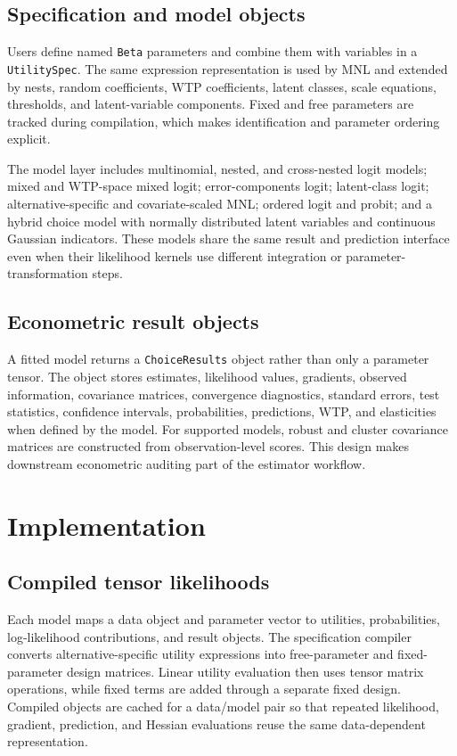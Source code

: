 \documentclass[11pt]{article}
\begin{document}
\subsection{Specification and model objects}

Users define named \texttt{Beta} parameters and combine them with variables in a
\texttt{UtilitySpec}. The same expression representation is used by MNL and
extended by nests, random coefficients, WTP coefficients, latent classes,
scale equations, thresholds, and latent-variable components. Fixed and free
parameters are tracked during compilation, which makes identification and
parameter ordering explicit.

The model layer includes multinomial, nested, and cross-nested logit models;
mixed and WTP-space mixed logit; error-components logit; latent-class logit;
alternative-specific and covariate-scaled MNL; ordered logit and probit; and a
hybrid choice model with normally distributed latent variables and continuous
Gaussian indicators. These models share the same result and prediction
interface even when their likelihood kernels use different integration or
parameter-transformation steps.

\subsection{Econometric result objects}

A fitted model returns a \texttt{ChoiceResults} object rather than only a
parameter tensor. The object stores estimates, likelihood values, gradients,
observed information, covariance matrices, convergence diagnostics, standard
errors, test statistics, confidence intervals, probabilities, predictions, WTP,
and elasticities when defined by the model. For supported models, robust and
cluster covariance matrices are constructed from observation-level scores. This
design makes downstream econometric auditing part of the estimator workflow.

\section{Implementation}
\label{sec:implementation}

\subsection{Compiled tensor likelihoods}

Each model maps a data object and parameter vector to utilities, probabilities,
log-likelihood contributions, and result objects. The specification compiler
converts alternative-specific utility expressions into free-parameter and
fixed-parameter design matrices. Linear utility evaluation then uses tensor
matrix operations, while fixed terms are added through a separate fixed design.
Compiled objects are cached for a data/model pair so that repeated likelihood,
gradient, prediction, and Hessian evaluations reuse the same data-dependent
representation.
\end{document}
